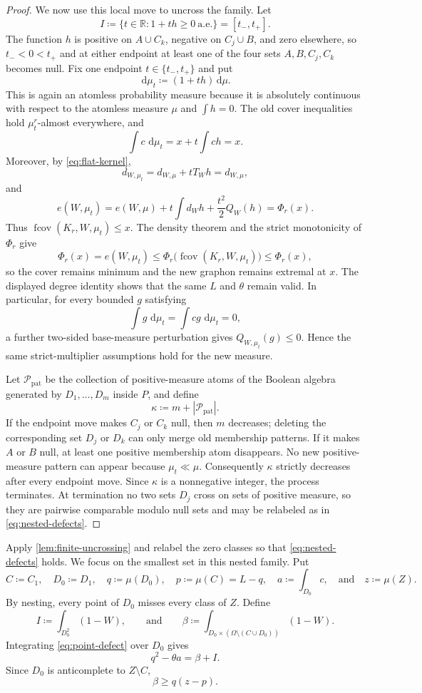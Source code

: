 \documentclass[10pt]{article}
\numberwithin{equation}{section}
\newcommand{\fcov}{\operatorname{fcov}}
\newcommand{\R}{\mathbb R}
\newcommand{\dd}{\,\mathrm d}
\begin{document}
\begin{proof}
We now use this local move to uncross the family.  Let
\[
 I\coloneqq\{t\in\R\colon 1+th\ge0\ \text{a.e.}\}=[t_-,t_+].
\]
The function $h$ is positive on $A\cup C_k$, negative on $C_j\cup B$, and zero elsewhere, so $t_-<0<t_+$ and at either endpoint at least one of the four sets $A,B,C_j,C_k$ becomes null.  Fix one endpoint $t\in\{t_-,t_+\}$ and put
\[
 \dd\mu_t\coloneqq(1+th)\dd\mu.
\]
This is again an atomless probability measure because it is absolutely continuous with respect to the atomless measure $\mu$ and $\int h=0$.  The old cover inequalities hold $\mu_t^r$-almost everywhere, and
\[
 \int c\,\dd\mu_t=x+t\int ch=x.
\]
Moreover, by \cref{eq:flat-kernel},
\[
 d_{W,\mu_t}=d_{W,\mu}+tT_Wh=d_{W,\mu},
\]
and
\[
 e(W,\mu_t)
 =e(W,\mu)+t\int d_Wh+\frac{t^2}{2}Q_W(h)
 =\Phi_r(x).
\]
Thus $\fcov(K_r,W,\mu_t)\le x$.  The density theorem and the strict monotonicity of $\Phi_r$ give
\[
 \Phi_r(x)=e(W,\mu_t)
 \le \Phi_r\bigl(\fcov(K_r,W,\mu_t)\bigr)
 \le \Phi_r(x),
\]
so the cover remains minimum and the new graphon remains extremal at $x$.  The displayed degree identity shows that the same $L$ and $\theta$ remain valid.  In particular, for every bounded $g$ satisfying
\[
 \int g\,\dd\mu_t=\int cg\,\dd\mu_t=0,
\]
a further two-sided base-measure perturbation gives $Q_{W,\mu_t}(g)\le0$.  Hence the same strict-multiplier assumptions hold for the new measure.

Let $\mathcal P_{\mathrm{pat}}$ be the collection of positive-measure atoms of the Boolean algebra generated by $D_1,\ldots,D_m$ inside $P$, and define
\[
 \kappa\coloneqq m+|\mathcal P_{\mathrm{pat}}|.
\]
If the endpoint move makes $C_j$ or $C_k$ null, then $m$ decreases; deleting the corresponding set $D_j$ or $D_k$ can only merge old membership patterns.  If it makes $A$ or $B$ null, at least one positive membership atom disappears.  No new positive-measure pattern can appear because $\mu_t\ll\mu$.  Consequently $\kappa$ strictly decreases after every endpoint move.  Since $\kappa$ is a nonnegative integer, the process terminates.  At termination no two sets $D_j$ cross on sets of positive measure, so they are pairwise comparable modulo null sets and may be relabeled as in \cref{eq:nested-defects}.
\end{proof}

Apply \cref{lem:finite-uncrossing} and relabel the zero classes so that \cref{eq:nested-defects} holds.  We focus on the smallest set in this nested family.  Put
\[
 C\coloneqq C_1,
 \quad D_0\coloneqq D_1,
 \quad q\coloneqq\mu(D_0),
 \quad p\coloneqq\mu(C)=L-q,
 \quad a\coloneqq\int_{D_0}c,
 \quad\text{and}\quad z\coloneqq\mu(Z).
\]
By nesting, every point of $D_0$ misses every class of $Z$.  Define
\[
 I\coloneqq\int_{D_0^2}(1-W),
 \qquad\text{and}\qquad
 \beta\coloneqq\int_{D_0\times(\Omega\setminus(C\cup D_0))}(1-W).
\]
Integrating \cref{eq:point-defect} over $D_0$ gives
\begin{equation}\label{eq:q2identity}
 q^2-\theta a=\beta+I.
\end{equation}
Since $D_0$ is anticomplete to $Z\setminus C$,
\begin{equation}\label{eq:beta-lower}
 \beta\ge q(z-p).
\end{equation}
\end{document}
